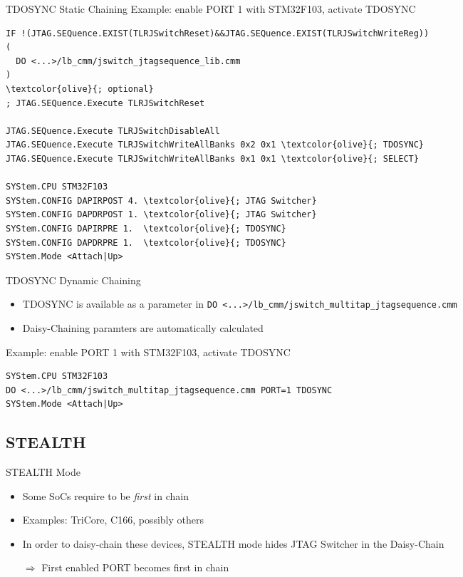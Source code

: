 \documentclass[aspectratio=169,12pt]{beamer}
\begin{document}
\begin{frame}[fragile]{TDOSYNC Static Chaining}
Example: enable PORT 1 with STM32F103, activate TDOSYNC

\begin{Verbatim}[fontsize=\tiny,commandchars=\\\{\}]
IF !(JTAG.SEQuence.EXIST(TLRJSwitchReset)&&JTAG.SEQuence.EXIST(TLRJSwitchWriteReg))
(
  DO <...>/lb_cmm/jswitch_jtagsequence_lib.cmm
)
\textcolor{olive}{; optional}
; JTAG.SEQuence.Execute TLRJSwitchReset

JTAG.SEQuence.Execute TLRJSwitchDisableAll
JTAG.SEQuence.Execute TLRJSwitchWriteAllBanks 0x2 0x1 \textcolor{olive}{; TDOSYNC}
JTAG.SEQuence.Execute TLRJSwitchWriteAllBanks 0x1 0x1 \textcolor{olive}{; SELECT}

SYStem.CPU STM32F103
SYStem.CONFIG DAPIRPOST 4. \textcolor{olive}{; JTAG Switcher}
SYStem.CONFIG DAPDRPOST 1. \textcolor{olive}{; JTAG Switcher}
SYStem.CONFIG DAPIRPRE 1.  \textcolor{olive}{; TDOSYNC}
SYStem.CONFIG DAPDRPRE 1.  \textcolor{olive}{; TDOSYNC}
SYStem.Mode <Attach|Up>
\end{Verbatim}
\end{frame}

\begin{frame}[fragile]{TDOSYNC Dynamic Chaining}
\begin{itemize}
\item TDOSYNC is available as a parameter in \texttt{DO <...>/lb\_cmm/jswitch\_multitap\_jtagsequence.cmm}
\item Daisy-Chaining paramters are automatically calculated
\end{itemize}
Example: enable PORT 1 with STM32F103, activate TDOSYNC
\begin{Verbatim}[fontsize=\tiny,commandchars=\\\{\}]
SYStem.CPU STM32F103
DO <...>/lb_cmm/jswitch_multitap_jtagsequence.cmm PORT=1 TDOSYNC
SYStem.Mode <Attach|Up>
\end{Verbatim}
\end{frame}

\subsection{STEALTH}
\begin{frame}{STEALTH Mode}
\begin{itemize}
\item Some SoCs require to be \emph{first} in chain
\item Examples: TriCore, C166, possibly others
\item In order to daisy-chain these devices, STEALTH mode hides JTAG Switcher in the Daisy-Chain
\item[$\Rightarrow$] First enabled PORT becomes first in chain
\end{itemize}
\begin{center}

\end{center}
\end{frame}
\end{document}
